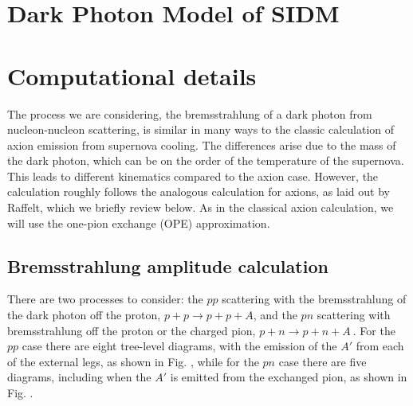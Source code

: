 \documentclass[nofootinbib,prd,superscriptaddress,twocolumn]{revtex4}
\begin{document}
\section{Dark Photon Model of SIDM}
\label{section:model}


\section{Computational details}
\label{section:computational}
	
	The process we are considering, the bremsstrahlung of a dark photon from nucleon-nucleon scattering, is similar in many ways to the classic calculation of axion emission from supernova cooling. The differences arise due to the mass of the dark photon, which can be on the order of the temperature of the supernova.  This leads to different kinematics compared to the axion case.  However, the calculation roughly follows the analogous calculation for axions, as laid out by Raffelt, which we briefly review below.  As in the classical axion calculation, we will use the one-pion exchange (OPE) approximation.  
	
\subsection{Bremsstrahlung amplitude calculation}
	 There are two processes to consider: the $pp$ scattering with the bremsstrahlung of the dark photon off the proton, $ p+p \rightarrow p+p+A$, and the $pn$ scattering with bremsstrahlung off the proton or the charged pion, $ p+n \rightarrow p+n+A\ $. For the $pp$ case there are eight tree-level diagrams, with the emission of the $A'$ from each of the external legs, as shown in Fig. , while for the $pn$ case there are five diagrams, including when the $A'$ is emitted from the exchanged pion, as shown in Fig. .
	
\end{document}
